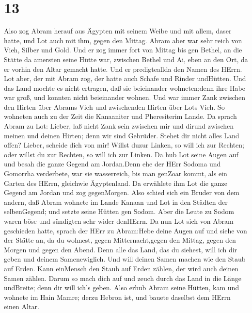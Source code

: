 \hypertarget{section-12}{%
\section{13}\label{section-12}}

 Also zog Abram herauf aus Ägypten mit seinem Weibe und mit
allem, daser hatte, und Lot auch mit ihm, gegen den Mittag. 
Abram aber war sehr reich von Vieh, Silber und Gold.  Und er
zog immer fort von Mittag bis gen Bethel, an die Stätte da amersten
seine Hütte war, zwischen Bethel und Ai,  eben an den Ort,
da er vorhin den Altar gemacht hatte. Und er predigteallda den Namen des
HErrn.  Lot aber, der mit Abram zog, der hatte auch Schafe
und Rinder undHütten.  Und das Land mochte es nicht
ertragen, daß sie beieinander wohneten;denn ihre Habe war groß, und
konnten nicht beieinander wohnen.  Und war immer Zank
zwischen den Hirten über Abrams Vieh und zwischenden Hirten über Lots
Vieh. So wohneten auch zu der Zeit die Kanaaniter und Pheresiterim
Lande.  Da sprach Abram zu Lot: Lieber, laß nicht Zank sein
zwischen mir und dirund zwischen meinen und deinen Hirten; denn wir sind
Gebrüder.  Stehet dir nicht alles Land offen? Lieber,
scheide dich von mir! Willst duzur Linken, so will ich zur Rechten; oder
willst du zur Rechten, so will ich zur Linken.  Da hub Lot
seine Augen auf und besah die ganze Gegend am Jordan.Denn ehe der HErr
Sodoma und Gomorrha verderbete, war sie wasserreich, bis man genZoar
kommt, als ein Garten des HErrn, gleichwie Ägyptenland.  Da
erwählete ihm Lot die ganze Gegend am Jordan und zog gegenMorgen. Also
schied sich ein Bruder von dem andern,  daß Abram wohnete
im Lande Kanaan und Lot in den Städten der selbenGegend; und setzte
seine Hütten gen Sodom.  Aber die Leute zu Sodom waren böse
und sündigten sehr wider denHErrn.  Da nun Lot sich von
Abram geschieden hatte, sprach der HErr zu Abram:Hebe deine Augen auf
und siehe von der Stätte an, da du wohnest, gegen Mitternacht,gegen den
Mittag, gegen den Morgen und gegen den Abend.  Denn alle
das Land, das du siehest, will ich dir geben und deinem Samenewiglich.
 Und will deinen Samen machen wie den Staub auf Erden. Kann
einMensch den Staub auf Erden zählen, der wird auch deinen Samen zählen.
 Darum so mach dich auf und zeuch durch das Land in die
Länge undBreite; denn dir will ich's geben.  Also erhub
Abram seine Hütten, kam und wohnete im Hain Mamre; derzu Hebron ist, und
bauete daselbst dem HErrn einen Altar.

